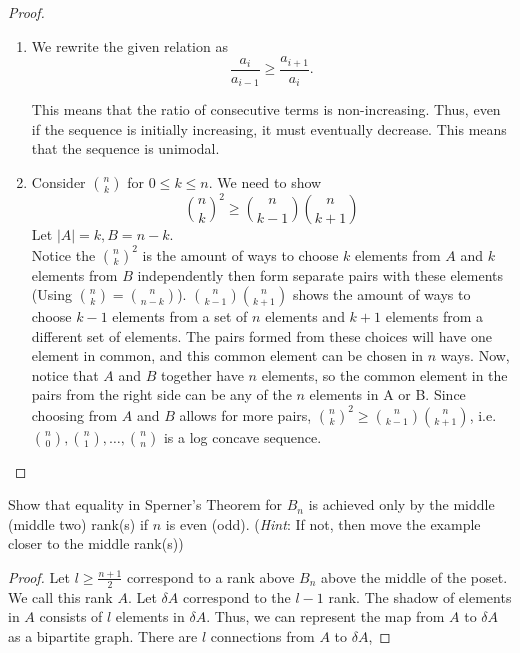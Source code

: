 \documentclass[11pt]{scrartcl}
\begin{document}
\begin{proof}
    \begin{enumerate}
        \item We rewrite the given relation as 
        \[
            \frac{a_i}{a_{i-1}} \ge \frac{a_{i+1}}{a_i}.
        \]
        
        This means that the ratio of consecutive terms is non-increasing. Thus, even if the sequence is initially increasing, it must eventually decrease. This means that the sequence is unimodal.
        \item Consider $\binom{n}{k}$ for $0 \leq k \leq n$. We need to show \[\binom{n}{k}^2 \geq \binom{n}{k-1} \binom{n}{k+1}\]
        Let $|A|=k, B=n-k$.\\
        Notice the $\binom{n}{k}^2$ is the amount of ways to choose $k$ elements from $A$ and $k$ elements from $B$ independently then form separate pairs with these elements (Using $\binom{n}{k} = \binom{n}{n-k}$).
        $\binom{n}{k-1} \binom{n}{k+1}$ shows the amount of ways to choose $k-1$ elements from a set of $n$ elements and $k+1$ elements from a different set of elements. The pairs formed from these choices will have one element in common, and this common element can be chosen in $n$ ways.
        Now, notice that $A$ and $B$ together have $n$ elements, so the common element in the pairs from the right side can be any of the $n$ elements in A or B. Since choosing from $A$ and $B$ allows for more pairs, $\binom{n}{k}^2 \geq \binom{n}{k-1} \binom{n}{k+1}$, i.e. $\binom{n}{0}, \binom{n}{1},\ldots, \binom{n}{n}$ is a log concave sequence.
    \end{enumerate}
\end{proof}

\begin{problem}[\textcolor{red}{Uniqueness in Sperner's Thm}]
    Show that equality in Sperner's Theorem for $B_n$ is achieved only by the middle (middle two) rank(s) if $n$ is even (odd). (\textit{Hint}: If not, then move the example closer to the middle rank(s))
\end{problem}
\begin{proof}
    Let $l \ge \frac{n + 1}{2}$ correspond to a rank above $B_n$ above the middle of the poset. We call this rank $A$. Let $\delta A$ correspond to the $l-1$ rank. The shadow of elements in $A$ consists of $l$ elements in $\delta A$. Thus, we can represent the map from $A$ to $\delta A$ as a bipartite graph. There are $l$ connections from $A$ to $\delta A$,  
\end{proof}
\end{document}
